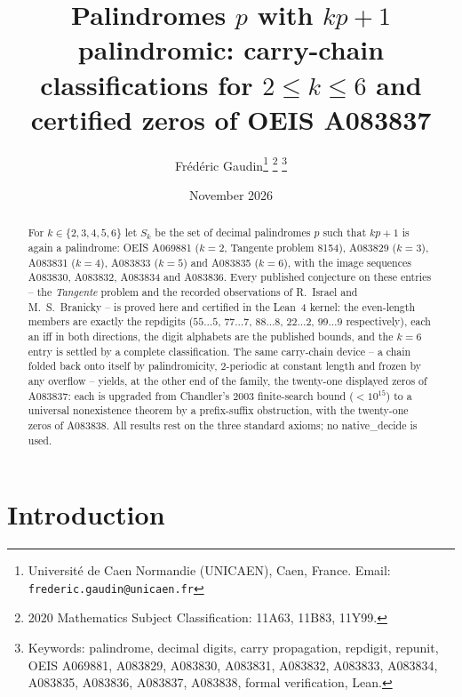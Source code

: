 \documentclass[12pt]{article}
\title{Palindromes $p$ with $kp+1$ palindromic:
carry-chain classifications for $2 \le k \le 6$ and
certified zeros of OEIS A083837}
\author{Fr\'ed\'eric Gaudin\thanks{Universit\'e de Caen
Normandie (UNICAEN), Caen, France. Email:
\texttt{frederic.gaudin@unicaen.fr}}%
\thanks{2020 Mathematics Subject Classification: 11A63,
11B83, 11Y99.}%
\thanks{Keywords: palindrome, decimal digits, carry
propagation, repdigit, repunit, OEIS A069881, A083829,
A083830, A083831, A083832, A083833, A083834, A083835,
A083836, A083837, A083838, formal verification, Lean.}}
\date{November 2026}
\begin{document}
\maketitle

\begin{abstract}
For $k \in \{2,3,4,5,6\}$ let $S_k$ be the set of decimal
palindromes $p$ such that $kp+1$ is again a palindrome:
OEIS A069881 ($k=2$, Tangente problem 8154), A083829
($k=3$), A083831 ($k=4$), A083833 ($k=5$) and A083835
($k=6$), with the image sequences A083830, A083832,
A083834 and A083836. Every published conjecture on these
entries -- the \emph{Tangente} problem and the recorded
observations of R.~Israel and M.~S.~Branicky -- is proved
here and certified in the Lean~4
kernel: the even-length members are exactly the repdigits
($55\ldots5$, $77\ldots7$, $88\ldots8$, $22\ldots2$,
$99\ldots9$ respectively), each an iff in both
directions, the digit alphabets are the published bounds,
and the $k=6$ entry is settled by a complete
classification. The same carry-chain device -- a chain
folded back onto itself by palindromicity, $2$-periodic
at constant length and frozen by any overflow -- yields,
at the other end of the family, the twenty-one displayed
zeros of A083837: each is upgraded from Chandler's 2003
finite-search bound ($< 10^{15}$) to a universal
nonexistence theorem by a prefix-suffix obstruction, with
the twenty-one zeros of A083838. All results rest on the
three standard axioms; no {\ttfamily native\_decide} is
used.
\end{abstract}

\section{Introduction}
\label{sec:intro}
\end{document}
